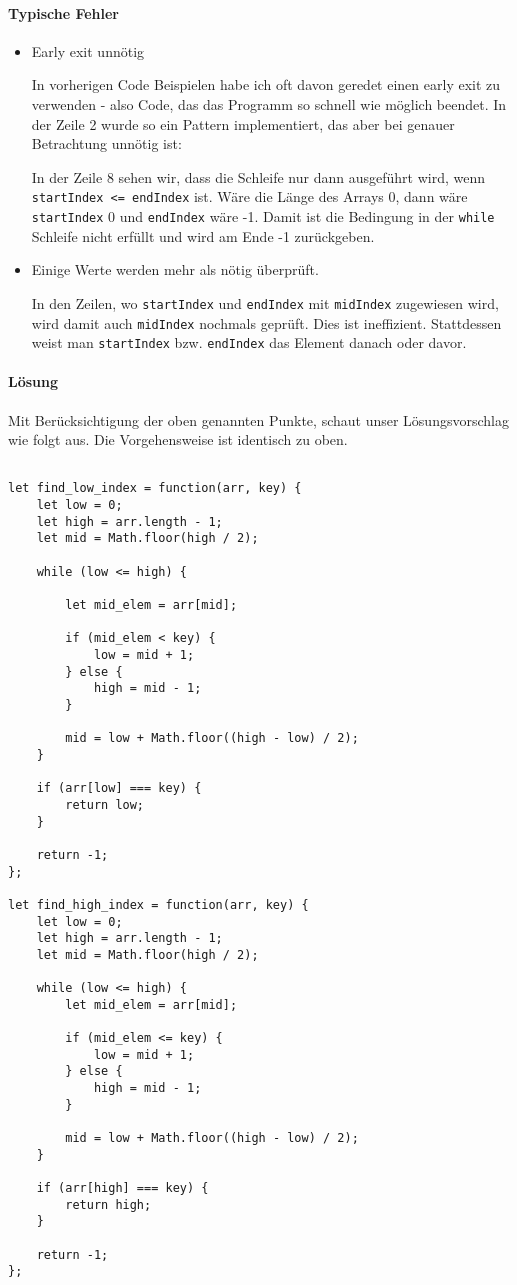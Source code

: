 \documentclass[babel]{book}
\begin{document}
\paragraph{Typische Fehler}
\begin{itemize} 
	\item Early exit unnötig
	
	In vorherigen Code Beispielen habe ich oft davon geredet einen early exit zu verwenden - also Code, das das Programm so schnell wie möglich beendet. In der Zeile 2 wurde so ein Pattern implementiert, das aber bei genauer Betrachtung unnötig ist:
	
	In der Zeile 8 sehen wir, dass die Schleife nur dann ausgeführt wird, wenn \lstinline|startIndex <= endIndex| ist. Wäre die Länge des Arrays 0, dann wäre \lstinline|startIndex| 0 und \lstinline|endIndex| wäre -1. Damit ist die Bedingung in der \lstinline|while| Schleife nicht erfüllt und wird am Ende -1 zurückgeben.
	
	\item Einige Werte werden mehr als nötig überprüft. 
	
	In den Zeilen, wo \lstinline|startIndex| und \lstinline|endIndex| mit \lstinline|midIndex| zugewiesen wird, wird damit auch \lstinline|midIndex| nochmals geprüft. Dies ist ineffizient. Stattdessen weist man \lstinline|startIndex| bzw. \lstinline|endIndex| das Element danach oder davor.
	
\end{itemize}


\paragraph{Lösung}
Mit Berücksichtigung der oben genannten Punkte, schaut unser Lösungsvorschlag wie folgt aus. Die Vorgehensweise ist identisch zu oben.

\begin{lstlisting}[caption=My Javascript Example]

let find_low_index = function(arr, key) {
	let low = 0;
	let high = arr.length - 1;
	let mid = Math.floor(high / 2);

	while (low <= high) {
	
		let mid_elem = arr[mid];
	
		if (mid_elem < key) {
			low = mid + 1;
		} else {
			high = mid - 1;
		}
	
		mid = low + Math.floor((high - low) / 2);
	}

	if (arr[low] === key) {
		return low;
	}

	return -1;
};

let find_high_index = function(arr, key) {
	let low = 0;
	let high = arr.length - 1;
	let mid = Math.floor(high / 2);

	while (low <= high) {
		let mid_elem = arr[mid];
	
		if (mid_elem <= key) {
			low = mid + 1;
		} else {
			high = mid - 1;
		}
	
		mid = low + Math.floor((high - low) / 2);
	}

	if (arr[high] === key) {
		return high;
	}

	return -1;
};
\end{lstlisting}
\end{document}
